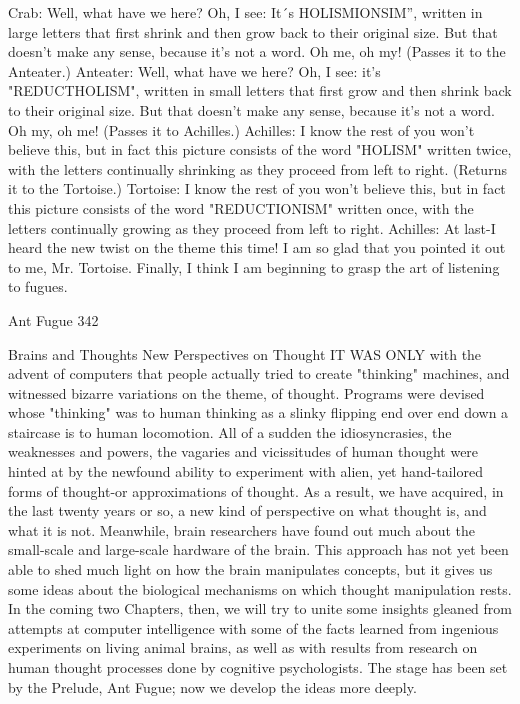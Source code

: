 Crab: Well, what have we here? Oh, I see: It´s HOLISMIONSIM”, written in large letters
    that first shrink and then grow back to their original size. But that doesn't make any
    sense, because it's not a word. Oh me, oh my! (Passes it to the Anteater.)
Anteater: Well, what have we here? Oh, I see: it's "REDUCTHOLISM", written in small
    letters that first grow and then shrink back to their original size. But that doesn't make
    any sense, because it's not a word. Oh my, oh me! (Passes it to Achilles.)
Achilles: I know the rest of you won't believe this, but in fact this picture consists of the
    word "HOLISM" written twice, with the letters continually shrinking as they proceed
    from left to right. (Returns it to the Tortoise.)
Tortoise: I know the rest of you won't believe this, but in fact this picture consists of the
    word "REDUCTIONISM" written once, with the letters continually growing as they
    proceed from left to right.
Achilles: At last-I heard the new twist on the theme this time! I am so glad that you
    pointed it out to me, Mr. Tortoise. Finally, I think I am beginning to grasp the art of
    listening to fugues.




Ant Fugue                                                                                 342

                            Brains and Thoughts
                          New Perspectives on Thought
IT WAS ONLY with the advent of computers that people actually tried to create
"thinking" machines, and witnessed bizarre variations on the theme, of thought. Programs
were devised whose "thinking" was to human thinking as a slinky flipping end over end
down a staircase is to human locomotion. All of a sudden the idiosyncrasies, the
weaknesses and powers, the vagaries and vicissitudes of human thought were hinted at by
the newfound ability to experiment with alien, yet hand-tailored forms of thought-or
approximations of thought. As a result, we have acquired, in the last twenty years or so, a
new kind of perspective on what thought is, and what it is not. Meanwhile, brain
researchers have found out much about the small-scale and large-scale hardware of the
brain. This approach has not yet been able to shed much light on how the brain
manipulates concepts, but it gives us some ideas about the biological mechanisms on
which thought manipulation rests.
In the coming two Chapters, then, we will try to unite some insights gleaned from
attempts at computer intelligence with some of the facts learned from ingenious
experiments on living animal brains, as well as with results from research on human
thought processes done by cognitive psychologists. The stage has been set by the
Prelude, Ant Fugue; now we develop the ideas more deeply.

